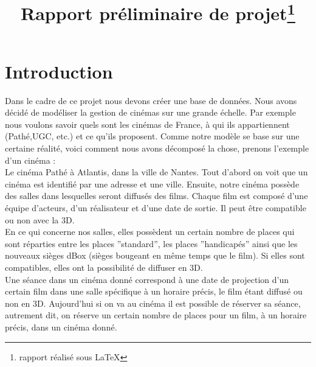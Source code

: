 \documentclass[a4paper,sffamily,12pt]{article}
\title{\vspace{\fill}\LARGE\bfseries\sffamily Rapport préliminaire de projet\protect\footnote{rapport réalisé sous \LaTeX} \vspace{\fill}}
\begin{document}
	\date{} %
	\maketitle %

	\thispagestyle{fancy} %
	
	\newpage
			
	\renewcommand{\contentsname}{Sommaire}
	\tableofcontents
	
	\newpage
	
	\section{Introduction}
		
		\vspace{0.5cm}
		
		Dans le cadre de ce projet nous devons créer une base de données. Nous avons décidé de modéliser la gestion de cinémas sur une grande échelle. Par exemple nous voulons savoir quels sont les cinémas de France, à qui ils appartiennent (Pathé,UGC, etc.) et ce qu'ils proposent. Comme notre modèle se base sur une certaine réalité, voici comment nous avons décomposé la chose, prenons  l'exemple d'un cinéma : \\
		\indent Le cinéma Pathé à Atlantis, dans la ville de Nantes. Tout d'abord on voit que un cinéma est identifié par une adresse et une ville. Ensuite, notre cinéma possède des salles dans lesquelles seront diffusés des films. Chaque film est composé d'une équipe d'acteurs, d'un réalisateur et d'une date de sortie. Il peut être compatible ou non avec la 3D. \\ 				
		\indent En ce qui concerne nos salles, elles possèdent un certain nombre de places qui sont réparties entre les places ''standard'', les places ''handicapés'' ainsi que les nouveaux sièges dBox (sièges bougeant en même temps que le film). Si elles sont compatibles, elles ont la possibilité de diffuser en 3D. \\
		\indent Une séance dans un cinéma donné correspond à une date de projection d'un certain film dans une salle spécifique à un horaire précis, le film étant diffusé ou non en 3D. Aujourd'hui si on va au cinéma il est possible de réserver sa séance, autrement dit, on réserve un certain nombre de places pour un film, à un horaire précis, dans un cinéma donné. 

		\vspace{0.5cm}
	
\end{document}
